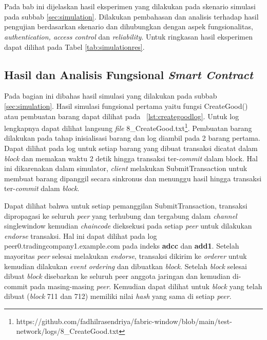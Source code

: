 \chapter{\babLima}
\label{bab:5}
Pada bab ini dijelaskan hasil eksperimen yang dilakukan pada skenario simulasi pada subbab \ref{sec:simulation}. Dilakukan pembahasan dan analisis terhadap hasil pengujian berdasarkan skenario dan dihubungkan dengan aspek fungsionalitas,  \textit{authentication, access control} dan \textit{reliability}. Untuk ringkasan hasil eksperimen dapat dilihat pada Tabel \ref{tab:simulationres}.

\section{Hasil dan Analisis Fungsional \textit{Smart Contract}}
Pada bagian ini dibahas hasil simulasi yang dilakukan pada subbab \ref{sec:simulation}. Hasil simulasi fungsional pertama yaitu fungsi CreateGood() atau pembuatan barang dapat dilihat pada \lst~\ref{lst:creategoodlog}. Untuk log lengkapnya dapat dilihat langsung \textit{file} 8\_CreateGood.txt\footnote{https://github.com/fadhilrasendriya/fabric-window/blob/main/test-network/logs/8\_CreateGood.txt}. Pembuatan barang dilakukan pada tahap inisialisasi barang dan log diambil pada 2 barang pertama. Dapat dilihat pada log untuk setiap barang yang dibuat transaksi dicatat dalam \textit{block} dan memakan waktu 2 detik hingga transaksi ter-\textit{commit} dalam block. Hal ini dikarenakan dalam simulator, \textit{client} melakukan SubmitTransaction untuk membuat barang dipanggil secara sinkronus dan menunggu hasil hingga transaksi ter-\textit{commit} dalam \textit{block}.

 



Dapat dilihat bahwa untuk setiap pemanggilan SubmitTransaction, transaksi dipropagasi ke seluruh \textit{peer} yang terhubung dan tergabung dalam \textit{channel} singlewindow kemudian \textit{chaincode} dieksekusi pada setiap \textit{peer} untuk dilakukan \textit{endorse} transaksi. Hal ini dapat dilihat pada log peer0.tradingcompany1.example.com pada indeks \textbf{adcc} dan \textbf{add1}. Setelah mayoritas \textit{peer} selesai melakukan \textit{endorse}, transaksi dikirim ke \textit{orderer} untuk kemudian dilakukan \textit{event ordering} dan dibuatkan \textit{block}. Setelah \textit{block} selesai dibuat \textit{block} disebarkan ke seluruh peer anggota jaringan dan kemudian di-commit pada masing-masing \textit{peer}. Kemudian dapat dilihat untuk \textit{block} yang telah dibuat (\textit{block} 711 dan 712) memiliki nilai \textit{hash} yang sama di setiap \textit{peer}.


